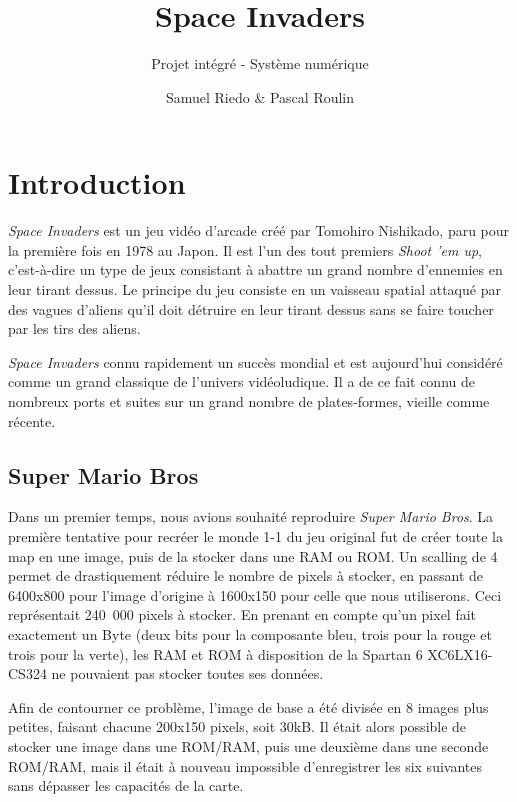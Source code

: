 \documentclass[french]{nakrule}
\author{Samuel Riedo \& Pascal Roulin}
\title{Space Invaders}
\subtitle{Projet intégré - Système numérique}
\begin{document}
\symmetricalPage
\tableofcontents
\asymmetricalPage
\clearpage

\chapter{Introduction}
\label{introduction}

\emph{Space Invaders} est un jeu vidéo d'arcade créé par Tomohiro Nishikado, paru pour
la première fois en 1978 au Japon. Il est l'un des tout premiers \emph{Shoot 'em
  up}, c'est-à-dire un type de jeux consistant à abattre un grand nombre d'ennemies en
leur tirant dessus. Le principe du jeu consiste en un vaisseau spatial attaqué
par des vagues d'aliens qu'il doit détruire en leur tirant dessus sans se faire
toucher par les tirs des aliens.

\emph{Space Invaders} connu rapidement un succès mondial et est aujourd'hui
considéré comme un grand classique de l'univers vidéoludique. Il a de ce fait
connu de nombreux ports et suites sur un grand nombre de plates-formes, vieille
comme récente.

\section{Super Mario Bros}
\label{sec:mario}

Dans un premier temps, nous avions souhaité reproduire \emph{Super Mario Bros}.
La première tentative pour recréer le monde 1-1 du jeu original fut de créer
toute la map en une image, puis de la stocker dans une RAM ou ROM.
Un scalling de 4 permet de drastiquement réduire le nombre de pixels à stocker,
en passant de 6400x800 pour l'image d'origine à 1600x150 pour celle que nous
utiliserons.
Ceci représentait \si{240.000} pixels à stocker. En prenant en compte qu'un pixel
fait exactement un Byte (deux bits pour la composante bleu, trois pour la rouge
et trois pour la verte), les RAM et ROM à disposition de la Spartan 6
XC6LX16-CS324 ne pouvaient pas stocker toutes ses données.

Afin de contourner ce problème, l'image de base a été divisée en 8 images plus
petites, faisant chacune 200x150 pixels, soit 30kB. Il était alors possible de
stocker une image dans une ROM/RAM, puis une deuxième dans une seconde ROM/RAM,
mais il était à nouveau impossible d'enregistrer les six suivantes sans dépasser
les capacités de la carte.
\end{document}
